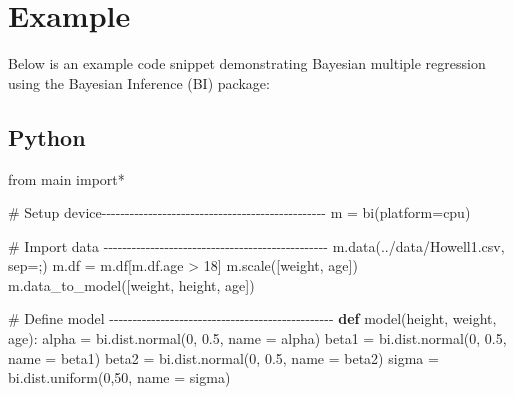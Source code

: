 \documentclass[
  letterpaper,
  DIV=11,
  numbers=noendperiod]{scrreprt}
\newenvironment{Shaded}{\begin{snugshade}}{\end{snugshade}}
\newcommand{\CommentTok}[1]{\textcolor[rgb]{0.37,0.37,0.37}{#1}}
\newcommand{\DecValTok}[1]{\textcolor[rgb]{0.68,0.00,0.00}{#1}}
\newcommand{\FloatTok}[1]{\textcolor[rgb]{0.68,0.00,0.00}{#1}}
\newcommand{\ImportTok}[1]{\textcolor[rgb]{0.00,0.46,0.62}{#1}}
\newcommand{\KeywordTok}[1]{\textcolor[rgb]{0.00,0.23,0.31}{\textbf{#1}}}
\newcommand{\NormalTok}[1]{\textcolor[rgb]{0.00,0.23,0.31}{#1}}
\newcommand{\OperatorTok}[1]{\textcolor[rgb]{0.37,0.37,0.37}{#1}}
\newcommand{\StringTok}[1]{\textcolor[rgb]{0.13,0.47,0.30}{#1}}
\begin{document}
\section{Example}\label{example-1}

Below is an example code snippet demonstrating Bayesian multiple
regression using the Bayesian Inference (BI) package:

\subsection{Python}

\begin{Shaded}
\begin{Highlighting}[]
\ImportTok{from}\NormalTok{ main }\ImportTok{import}\OperatorTok{*}

\CommentTok{\# Setup device{-}{-}{-}{-}{-}{-}{-}{-}{-}{-}{-}{-}{-}{-}{-}{-}{-}{-}{-}{-}{-}{-}{-}{-}{-}{-}{-}{-}{-}{-}{-}{-}{-}{-}{-}{-}{-}{-}{-}{-}{-}{-}{-}{-}{-}{-}{-}{-}}
\NormalTok{m }\OperatorTok{=}\NormalTok{ bi(platform}\OperatorTok{=}\StringTok{\textquotesingle{}cpu\textquotesingle{}}\NormalTok{)}

\CommentTok{\# Import data {-}{-}{-}{-}{-}{-}{-}{-}{-}{-}{-}{-}{-}{-}{-}{-}{-}{-}{-}{-}{-}{-}{-}{-}{-}{-}{-}{-}{-}{-}{-}{-}{-}{-}{-}{-}{-}{-}{-}{-}{-}{-}{-}{-}{-}{-}{-}{-}}
\NormalTok{m.data(}\StringTok{\textquotesingle{}../data/Howell1.csv\textquotesingle{}}\NormalTok{, sep}\OperatorTok{=}\StringTok{\textquotesingle{};\textquotesingle{}}\NormalTok{) }
\NormalTok{m.df }\OperatorTok{=}\NormalTok{ m.df[m.df.age }\OperatorTok{\textgreater{}} \DecValTok{18}\NormalTok{]}
\NormalTok{m.scale([}\StringTok{\textquotesingle{}weight\textquotesingle{}}\NormalTok{, }\StringTok{\textquotesingle{}age\textquotesingle{}}\NormalTok{])}
\NormalTok{m.data\_to\_model([}\StringTok{\textquotesingle{}weight\textquotesingle{}}\NormalTok{, }\StringTok{\textquotesingle{}height\textquotesingle{}}\NormalTok{, }\StringTok{\textquotesingle{}age\textquotesingle{}}\NormalTok{])}

\CommentTok{\# Define model {-}{-}{-}{-}{-}{-}{-}{-}{-}{-}{-}{-}{-}{-}{-}{-}{-}{-}{-}{-}{-}{-}{-}{-}{-}{-}{-}{-}{-}{-}{-}{-}{-}{-}{-}{-}{-}{-}{-}{-}{-}{-}{-}{-}{-}{-}{-}{-}}
\KeywordTok{def}\NormalTok{ model(height, weight, age):}
\NormalTok{    alpha }\OperatorTok{=}\NormalTok{ bi.dist.normal(}\DecValTok{0}\NormalTok{, }\FloatTok{0.5}\NormalTok{, name }\OperatorTok{=} \StringTok{\textquotesingle{}alpha\textquotesingle{}}\NormalTok{)    }
\NormalTok{    beta1 }\OperatorTok{=}\NormalTok{ bi.dist.normal(}\DecValTok{0}\NormalTok{, }\FloatTok{0.5}\NormalTok{, name }\OperatorTok{=} \StringTok{\textquotesingle{}beta1\textquotesingle{}}\NormalTok{)}
\NormalTok{    beta2 }\OperatorTok{=}\NormalTok{ bi.dist.normal(}\DecValTok{0}\NormalTok{, }\FloatTok{0.5}\NormalTok{, name }\OperatorTok{=} \StringTok{\textquotesingle{}beta2\textquotesingle{}}\NormalTok{)}
\NormalTok{    sigma }\OperatorTok{=}\NormalTok{ bi.dist.uniform(}\DecValTok{0}\NormalTok{,}\DecValTok{50}\NormalTok{, name }\OperatorTok{=} \StringTok{\textquotesingle{}sigma\textquotesingle{}}\NormalTok{)}


\end{Highlighting}
\end{Shaded}
\end{document}
